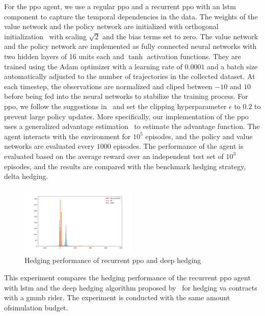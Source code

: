 For the \gls{ppo} agent, we use a regular \gls{ppo} and a recurrent \gls{ppo} with an \gls{lstm} component to capture the temporal dependencies in the data.
The weights of the value network and the policy network are initialized with orthogonal initialization~\citep{engstrom2020implementation} with scaling $\sqrt{2}$ and the bias terms set to zero.
The value network and the policy network are implemented as fully connected neural networks with two hidden layers of 16 units each and $\tanh$ activation functions.
They are trained using the Adam optimizer with a learning rate of $0.0001$ and a batch size automatically adjusted to the number of trajectories in the collected dataset.
At each timestep, the observations are normalized and cliped between $-10$ and $10$ before being fed into the neural networks to stabilize the training process.
For \gls{ppo}, we follow the suggestions in~\cite{schulman2017proximal} and set the clipping hyperparameter $\epsilon$ to $0.2$ to prevent large policy updates. 
More specifically, our implementation of the \gls{ppo} uses a generalized advantage estimation~\citep{schulman2015high} to estimate the advantage function.
The agent interacts with the environment for $10^5$ episodes, and the policy and value networks are evaluated every $1000$ episodes.
The performance of the agent is evaluated based on the average reward over an independent test set of $10^3$ episodes, and the results are compared with the benchmark hedging strategy, delta hedging.

\begin{figure}[ht!]
    \centering
    \includegraphics[width=0.5\textwidth]{./futureWork/figures/PPO_DH.png}
    \caption{Hedging performance of recurrent \gls{ppo} and deep hedging}
    \label{fig3:ppo_dh}
\end{figure}

This experiment compares the hedging performance of the recurrent \gls{ppo} agent with \gls{lstm} and the deep hedging algorithm proposed by~\cite{buehler2019deep} for hedging \gls{va} contracts with a \gls{gmmb} rider.
The experiment is conducted with the same amount ofsimulation budget.


